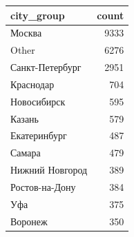 \begin{tabular}{lr}
\toprule
\textbf{city\_group} & \textbf{count} \\
\midrule
Москва & 9333 \\
Other & 6276 \\
Санкт-Петербург & 2951 \\
Краснодар & 704 \\
Новосибирск & 595 \\
Казань & 579 \\
Екатеринбург & 487 \\
Самара & 479 \\
Нижний Новгород & 389 \\
Ростов-на-Дону & 384 \\
Уфа & 375 \\
Воронеж & 350 \\
\bottomrule
\end{tabular}
